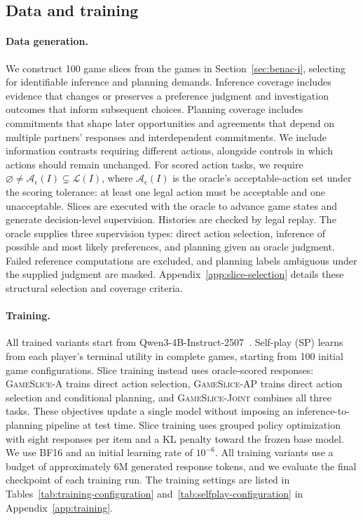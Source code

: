 \label{sec:experiment}

\subsection{Data and training}
\label{sec:experiment-training}

\paragraph{Data generation.}
We construct 100 game slices from the games in Section~\ref{sec:benac-i},
selecting for identifiable inference and planning demands. Inference
coverage includes evidence that changes or preserves a preference judgment
and investigation outcomes that inform subsequent choices. Planning coverage
includes commitments that shape later opportunities and agreements that
depend on multiple partners' responses and interdependent commitments.
We include information contrasts requiring different actions, alongside
controls in which actions should remain unchanged. For scored action tasks,
we require $\varnothing\neq\mathcal A_\epsilon(I)\subsetneq\mathcal L(I)$,
where $\mathcal A_\epsilon(I)$ is the oracle's acceptable-action set under
the scoring tolerance: at least one legal action must be acceptable and one
unacceptable. Slices are executed with the oracle to advance game states
and generate decision-level supervision. Histories are checked by legal replay. The oracle supplies
three supervision types: direct action selection, inference of possible and
most likely preferences, and planning given an oracle judgment. Failed
reference computations are excluded, and planning labels ambiguous under
the supplied judgment are masked. Appendix~\ref{app:slice-selection}
details these structural selection and coverage criteria.

\paragraph{Training.}
All trained variants start from Qwen3-4B-Instruct-2507~\citep{yang2025qwen3}. Self-play (SP) learns from each
player's terminal utility in complete games, starting from 100 initial
game configurations. Slice training instead uses
oracle-scored responses: \textsc{GameSlice-A} trains direct action selection,
\textsc{GameSlice-AP} trains direct action selection and conditional planning, and
\textsc{GameSlice-Joint} combines all three tasks. These objectives update
a single model without imposing an inference-to-planning pipeline at test
time. Slice training uses grouped policy optimization with eight responses
per item and a KL penalty toward the frozen base model. We use BF16 and an
initial learning rate of $10^{-6}$. All training variants use a budget of
approximately 6M generated response tokens, and we evaluate the final
checkpoint of each training run. The training settings
are listed in Tables~\ref{tab:training-configuration}
and~\ref{tab:selfplay-configuration} in
Appendix~\ref{app:training}.

